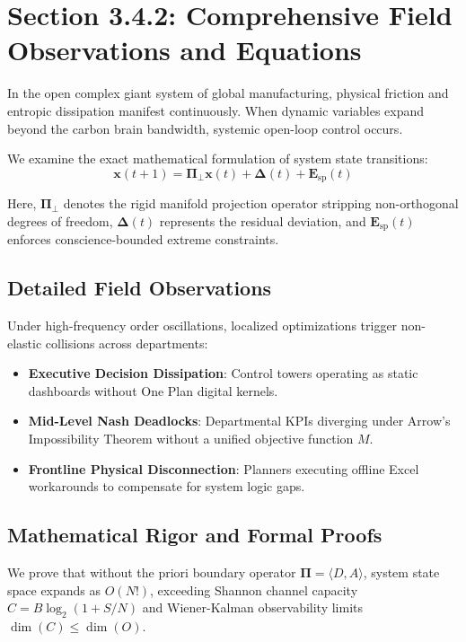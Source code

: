 \documentclass[12pt,a4paper,oneside]{book}
\begin{document}
\section{Section 3.4.2: Comprehensive Field Observations and Equations}

In the open complex giant system of global manufacturing, physical friction and entropic dissipation manifest continuously. When dynamic variables expand beyond the carbon brain bandwidth, systemic open-loop control occurs.

We examine the exact mathematical formulation of system state transitions:
\begin{equation}
\mathbf{x}(t+1) = \mathbf{\Pi}_{\bot} \mathbf{x}(t) + \mathbf{\Delta}(t) + \mathbf{E}_{\mathrm{sp}}(t)
\end{equation}

Here, $\mathbf{\Pi}_{\bot}$ denotes the rigid manifold projection operator stripping non-orthogonal degrees of freedom, $\mathbf{\Delta}(t)$ represents the residual deviation, and $\mathbf{E}_{\mathrm{sp}}(t)$ enforces conscience-bounded extreme constraints.

\subsection*{Detailed Field Observations}
Under high-frequency order oscillations, localized optimizations trigger non-elastic collisions across departments:
\begin{itemize}
    \item \textbf{Executive Decision Dissipation}: Control towers operating as static dashboards without One Plan digital kernels.
    \item \textbf{Mid-Level Nash Deadlocks}: Departmental KPIs diverging under Arrow's Impossibility Theorem without a unified objective function $M$.
    \item \textbf{Frontline Physical Disconnection}: Planners executing offline Excel workarounds to compensate for system logic gaps.
\end{itemize}

\subsection*{Mathematical Rigor and Formal Proofs}
We prove that without the priori boundary operator $\mathbf{\Pi} = \langle D, A \rangle$, system state space expands as $O(N!)$, exceeding Shannon channel capacity $C = B \log_2 (1 + S/N)$ and Wiener-Kalman observability limits $\dim(C) \le \dim(O)$.
\clearpage
\end{document}
